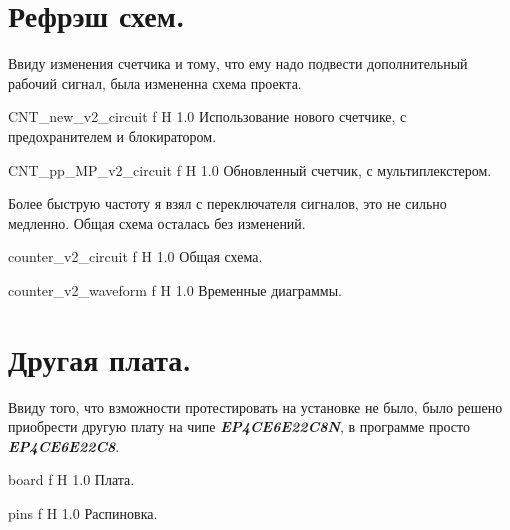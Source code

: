 \documentclass{bmstu}
\begin{document}
	\section{Рефрэш схем.}
	
	\begin{flushleft}
		Ввиду изменения счетчика и тому, что ему надо подвести дополнительный рабочий сигнал, была измененна схема проекта.
	\end{flushleft}
	
	{CNT_new_v2_circuit}
	{f} %
	{H} %
	{1.0\textwidth} %
	{Использование нового счетчике, с предохранителем и блокиратором.} %
	
	{CNT_pp_MP_v2_circuit}
	{f} %
	{H} %
	{1.0\textwidth} %
	{Обновленный счетчик, с мультиплекстером.} %

	
	\begin{flushleft}
		Более быструю частоту я взял с переключателя сигналов, это не сильно медленно. Общая схема осталась без изменений.
	\end{flushleft}

	{counter_v2_circuit}
	{f} %
	{H} %
	{1.0\textwidth} %
	{Общая схема.} %
	
	{counter_v2_waveform}
	{f} %
	{H} %
	{1.0\textwidth} %
	{Временные диаграммы.} %
	
	\section{Другая плата.}
	
	\begin{flushleft}
		Ввиду того, что взможности протестировать на установке не было, было решено приобрести другую плату на чипе \textbf{\em{EP4CE6E22C8N}}, в программе просто
		\textbf{\em{EP4CE6E22C8}}.
	\end{flushleft}

	{board}
	{f} %
	{H} %
	{1.0\textwidth} %
	{Плата.} %
	
	{pins}
	{f} %
	{H} %
	{1.0\textwidth} %
	{Распиновка.} %
\end{document}
